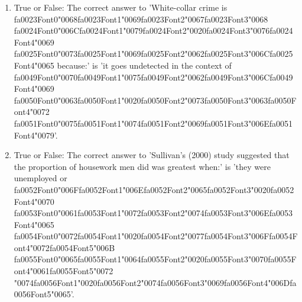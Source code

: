 \documentclass[12pt]{article}
\begin{document}
\begin{enumerate}[label=\arabic*.]
\item True or False: The correct answer to 'White-collar crime is {\csname fa0023Font0\endcsname\char"0068}{\csname fa0023Font1\endcsname\char"0069}{\csname fa0023Font2\endcsname\char"0067}{\csname fa0023Font3\endcsname\char"0068} {\csname fa0024Font0\endcsname\char"006C}{\csname fa0024Font1\endcsname\char"0079}{\csname fa0024Font2\endcsname\char"0020}{\csname fa0024Font3\endcsname\char"0076}{\csname fa0024Font4\endcsname\char"0069} {\csname fa0025Font0\endcsname\char"0073}{\csname fa0025Font1\endcsname\char"0069}{\csname fa0025Font2\endcsname\char"0062}{\csname fa0025Font3\endcsname\char"006C}{\csname fa0025Font4\endcsname\char"0065} because:' is 'it goes undetected in the context of {\csname fa0049Font0\endcsname\char"0070}{\csname fa0049Font1\endcsname\char"0075}{\csname fa0049Font2\endcsname\char"0062}{\csname fa0049Font3\endcsname\char"006C}{\csname fa0049Font4\endcsname\char"0069} {\csname fa0050Font0\endcsname\char"0063}{\csname fa0050Font1\endcsname\char"0020}{\csname fa0050Font2\endcsname\char"0073}{\csname fa0050Font3\endcsname\char"0063}{\csname fa0050Font4\endcsname\char"0072} {\csname fa0051Font0\endcsname\char"0075}{\csname fa0051Font1\endcsname\char"0074}{\csname fa0051Font2\endcsname\char"0069}{\csname fa0051Font3\endcsname\char"006E}{\csname fa0051Font4\endcsname\char"0079}'.
\item True or False: The correct answer to 'Sullivan's (2000) study suggested that the proportion of housework men did was greatest when:' is 'they were unemployed or {\csname fa0052Font0\endcsname\char"006F}{\csname fa0052Font1\endcsname\char"006E}{\csname fa0052Font2\endcsname\char"0065}{\csname fa0052Font3\endcsname\char"0020}{\csname fa0052Font4\endcsname\char"0070} {\csname fa0053Font0\endcsname\char"0061}{\csname fa0053Font1\endcsname\char"0072}{\csname fa0053Font2\endcsname\char"0074}{\csname fa0053Font3\endcsname\char"006E}{\csname fa0053Font4\endcsname\char"0065} {\csname fa0054Font0\endcsname\char"0072}{\csname fa0054Font1\endcsname\char"0020}{\csname fa0054Font2\endcsname\char"0077}{\csname fa0054Font3\endcsname\char"006F}{\csname fa0054Font4\endcsname\char"0072}{\csname fa0054Font5\endcsname\char"006B} {\csname fa0055Font0\endcsname\char"0065}{\csname fa0055Font1\endcsname\char"0064}{\csname fa0055Font2\endcsname\char"0020}{\csname fa0055Font3\endcsname\char"0070}{\csname fa0055Font4\endcsname\char"0061}{\csname fa0055Font5\endcsname\char"0072} {\char"0074}{\csname fa0056Font1\endcsname\char"0020}{\csname fa0056Font2\endcsname\char"0074}{\csname fa0056Font3\endcsname\char"0069}{\csname fa0056Font4\endcsname\char"006D}{\csname fa0056Font5\endcsname\char"0065}'.

\end{enumerate}
\end{document}
